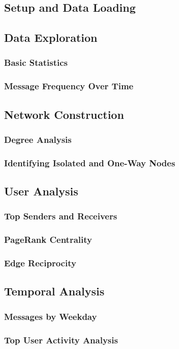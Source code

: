 
\subsection{Setup and Data Loading}

\subsection{Data Exploration}
\subsubsection{Basic Statistics}
\subsubsection{Message Frequency Over Time}

\subsection{Network Construction}
\subsubsection{Degree Analysis}
\subsubsection{Identifying Isolated and One-Way Nodes}

\subsection{User Analysis}
\subsubsection{Top Senders and Receivers}
\subsubsection{PageRank Centrality}
\subsubsection{Edge Reciprocity}

\subsection{Temporal Analysis}
\subsubsection{Messages by Weekday}
\subsubsection{Top User Activity Analysis}

